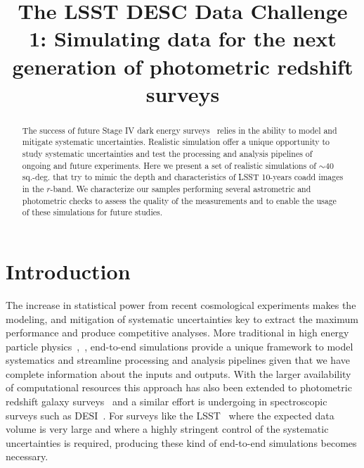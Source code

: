 \documentclass[\docopts]{\docclass}
\begin{document}
\title{ The LSST DESC Data Challenge 1: Simulating data for the next generation of photometric redshift surveys }

\maketitlepre

\begin{abstract}

The success of future Stage IV dark energy surveys~\citep{2006astro.ph..9591A} relies in the ability to model and mitigate
systematic uncertainties. Realistic simulation offer a unique opportunity to study systematic uncertainties and test the
processing and analysis pipelines of ongoing and future experiments. Here we present a set of realistic simulations
of $\sim 40$ sq.-deg. that try to mimic the depth and characteristics of LSST 10-years coadd images in the $r$-band.
We characterize our samples performing several astrometric and photometric checks to assess the quality of the
measurements and to enable the usage of these simulations for future studies.

\end{abstract}


\maketitlepost

%

\section{Introduction}
\label{sec:intro}

The increase in statistical power from recent cosmological experiments makes the modeling, and mitigation of systematic
uncertainties key to extract the maximum performance and produce competitive analyses. More traditional in high energy
particle physics~\citep{Brun:118715},~\citep{2006JHEP...05..026S}, end-to-end simulations provide a unique framework to
model systematics and streamline processing and analysis pipelines given that we have complete information about the inputs
and outputs. With the larger availability of computational resources this approach has also been extended to photometric
redshift galaxy surveys~\citep{2016MNRAS.457..786S,2016ApJ...817...25B} and a similar effort is undergoing in spectroscopic
surveys such as DESI~\citep{2016arXiv161100036D}. For surveys like the LSST~\citep{2008arXiv0805.2366I} where the expected
data volume is very large and where a highly stringent control of the systematic uncertainties is required, producing these
kind of end-to-end simulations becomes necessary.
\end{document}
